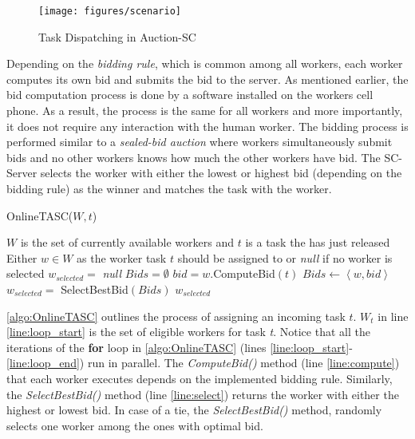 \begin{figure}[h]
    \centering
    \texttt{[image: figures/scenario]}
    \vspace{-0.15in}
    \caption{Task Dispatching in Auction-SC}
    \label{fig:dispatch}
\end{figure}

Depending on the \textit{bidding rule}, which is common among all workers, each worker computes its own bid and submits the bid to the server. As mentioned earlier, the bid computation process is done by a software installed on the workers cell phone. As a result, the process is the same for all workers and more importantly, it does not require any interaction with the human worker. The bidding process is performed similar to a \textit{sealed-bid auction} where workers simultaneously submit bids and no other workers knows how much the other workers have bid. The SC-Server selects the worker with either the lowest or highest bid (depending on the bidding rule) as the winner and matches the task with the worker.\\

\begin{algorithm}
\caption{OnlineTASC($W, t$)}
\label{algo:OnlineTASC}
\begin{algorithmic}[1]
\REQUIRE $W$ is the set of currently available workers and $t$ is a task the has just released
\ENSURE Either $w \in W$ as the worker task $t$ should be assigned to or \emph{null} if no worker is selected
\STATE $w_{selected} = $ \emph{null}
\STATE $Bids = \emptyset$
 \label{line:loop_start}
	\STATE $bid = w$.ComputeBid$(t)$ \label{line:compute}
	\STATE $Bids \leftarrow \left\langle w, bid \right\rangle$
\ENDFOR \label{line:loop_end}
\STATE $w_{selected} = $ SelectBestBid$(Bids)$ \label{line:select}
\RETURN $w_{selected}$
\end{algorithmic}
\end{algorithm}

\cref{algo:OnlineTASC} outlines the process of assigning an incoming task $t$. $W_t$ in line \ref{line:loop_start} is the set of eligible workers for task \textit{t}. Notice that all the iterations of the \textbf{for} loop in \cref{algo:OnlineTASC} (lines \ref{line:loop_start}-\ref{line:loop_end}) run in parallel. The \emph{ComputeBid()} method (line \ref{line:compute}) that each worker executes depends on the implemented bidding rule. Similarly, the \emph{SelectBestBid()} method (line \ref{line:select}) returns the worker with either the highest or lowest bid. In case of a tie, the \emph{SelectBestBid()} method, randomly selects one worker among the ones with optimal bid.\\

